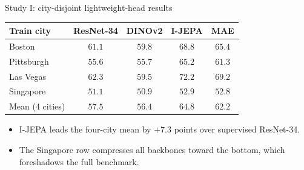 \documentclass[aspectratio=169, xcolor={table}]{beamer}
\begin{document}
\begin{frame}{Study I: city-disjoint lightweight-head results}
  \centering\small
  \begin{tabular}{@{}lcccc@{}}
    \toprule
    \textbf{Train city} & \textcolor{sup}{\textbf{ResNet-34}} & DINOv2 & \textcolor{ssl}{\textbf{I-JEPA}} & MAE \\
    \midrule
    Boston     & $61.1$ & $59.8$ & $\mathbf{68.8}$ & $65.4$ \\
    Pittsburgh & $55.6$ & $55.7$ & $\mathbf{65.2}$ & $61.3$ \\
    Las Vegas  & $62.3$ & $59.5$ & $\mathbf{72.2}$ & $69.2$ \\
    Singapore  & $51.1$ & $50.9$ & $\mathbf{52.9}$ & $52.8$ \\
    \midrule
    \rowcolor{gray!12}
    Mean (4 cities) & $57.5$ & $56.4$ & $\mathbf{64.8}$ & $62.2$ \\
    \bottomrule
  \end{tabular}
  \vspace{8pt}
  \begin{itemize}\footnotesize
    \item I-JEPA leads the four-city mean by $+7.3$ points over supervised ResNet-34.
    \item The Singapore row compresses all backbones toward the bottom, which foreshadows the full benchmark.
  \end{itemize}
\end{frame}
\end{document}
